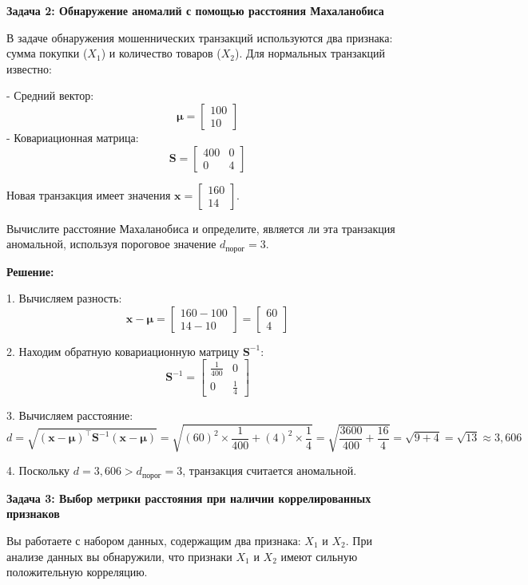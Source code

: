\textbf{Задача 2: Обнаружение аномалий с помощью расстояния Махаланобиса}

В задаче обнаружения мошеннических транзакций используются два признака: сумма покупки (\( X_1 \)) и количество товаров (\( X_2 \)). Для нормальных транзакций известно:

- Средний вектор:
  \[
  \mathbf{\mu} = \begin{bmatrix} 100 \\ 10 \end{bmatrix}
  \]
- Ковариационная матрица:
  \[
  \mathbf{S} = \begin{bmatrix} 400 & 0 \\ 0 & 4 \end{bmatrix}
  \]

Новая транзакция имеет значения \( \mathbf{x} = \begin{bmatrix} 160 \\ 14 \end{bmatrix} \).

Вычислите расстояние Махаланобиса и определите, является ли эта транзакция аномальной, используя пороговое значение \( d_{\text{порог}} = 3 \).

\textbf{Решение:}

1. Вычисляем разность:
\[
\mathbf{x} - \mathbf{\mu} = \begin{bmatrix} 160 - 100 \\ 14 - 10 \end{bmatrix} = \begin{bmatrix} 60 \\ 4 \end{bmatrix}
\]

2. Находим обратную ковариационную матрицу \( \mathbf{S}^{-1} \):
\[
\mathbf{S}^{-1} = \begin{bmatrix} \frac{1}{400} & 0 \\ 0 & \frac{1}{4} \end{bmatrix}
\]

3. Вычисляем расстояние:
\[
d = \sqrt{ (\mathbf{x} - \mathbf{\mu})^\top \mathbf{S}^{-1} (\mathbf{x} - \mathbf{\mu}) } = \sqrt{ (60)^2 \times \frac{1}{400} + (4)^2 \times \frac{1}{4} } = \sqrt{ \frac{3600}{400} + \frac{16}{4} } = \sqrt{9 + 4} = \sqrt{13} \approx 3{,}606
\]

4. Поскольку \( d = 3{,}606 > d_{\text{порог}} = 3 \), транзакция считается аномальной.

\textbf{Задача 3: Выбор метрики расстояния при наличии коррелированных признаков}

Вы работаете с набором данных, содержащим два признака: \( X_1 \) и \( X_2 \). При анализе данных вы обнаружили, что признаки \( X_1 \) и \( X_2 \) имеют сильную положительную корреляцию.


